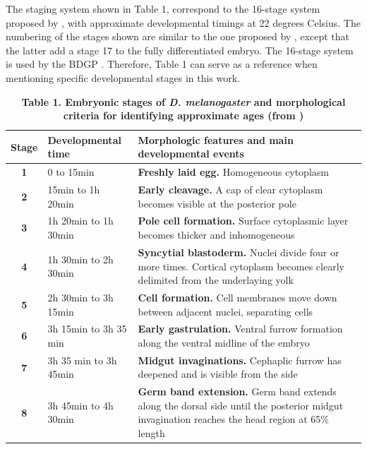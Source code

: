 The staging system shown in Table 1, correspond to the 16-stage system proposed by \citep{Roberts1998}, with approximate developmental timings at 22 degrees Celsius. 
The numbering of the stages shown are similar to the one proposed by \citet{Campos-Ortega1985}, except that the latter add a stage 17 to the fully differentiated embryo.
The 16-stage system is used by the BDGP \citep{Tomancak2002}. Therefore, Table 1 can serve as a reference when mentioning specific developmental stages in this work.
\label{Table_droso}
\begin{table}
    \centering
\caption*{\textbf{Table 1. Embryonic stages of \textit{D. melanogaster} and morphological criteria for identifying approximate ages (from \citealp{Roberts1998}) }}
\begin{tabular}{|c|p{3.5cm}|p{14cm}|}
\hline
\textbf{Stage}&\textbf{Developmental time}&\textbf{Morphologic features and main developmental events}\\
\hline
\textbf{1}	& 0 to 15min	& \textbf{Freshly laid egg.} Homogeneous cytoplasm	\\
%
\textbf{2}	& 15min to 1h 20min	&  \textbf{Early cleavage.} A cap of clear cytoplasm becomes visible at the posterior pole 	\\  
%
\textbf{3}	& 1h 20min to 1h 30min	&  \textbf{Pole cell formation.} Surface cytoplasmic layer becomes thicker and inhomogeneous	\\  
%
\textbf{4}	& 1h 30min to 2h 30min & \textbf{Syncytial blastoderm.} Nuclei divide four or more times. Cortical cytoplasm  becomes clearly delimited	from the underlaying yolk\\
%
\textbf{5}	& 2h 30min to 3h 15min	& \textbf{Cell formation.} Cell membranes move down between adjacent nuclei, separating cells	\\
%
\textbf{6}	& 3h 15min to 3h 35 min	&  \textbf{Early gastrulation.} Ventral furrow formation along the ventral midline of the embryo \\
%
\textbf{7}	& 3h 35 min to 3h 45min	&  \textbf{Midgut invaginations.} Cephaplic furrow has deepened and is visible from the side	\\
%
\textbf{8}	& 3h 45min to 4h 30min	&  \textbf{Germ band extension.} Germ band extends along the dorsal side until the posterior midgut invagination reaches the head region at 65\% length	\\

\end{tabular}
\end{table}
